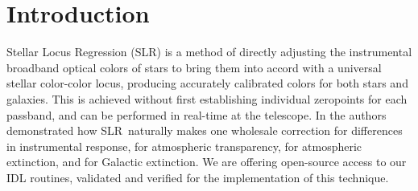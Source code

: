 \documentclass{report}
\newcommand{\slr}{SLR}
\begin{document}





\tableofcontents
{}
\setcounter{page}{1}

% 

\chapter{Introduction}

Stellar Locus Regression (\slr) is a method of directly adjusting the
instrumental broadband optical colors of stars to bring them into
accord with a universal stellar color-color locus, producing
accurately calibrated colors for both stars and galaxies.  This is
achieved without first establishing individual zeropoints for each
passband, and can be performed in real-time at the telescope.  In
\citet{bib:slr} the authors demonstrated how \slr\ naturally makes one
wholesale correction for differences in instrumental response, for
atmospheric transparency, for atmospheric extinction, and for Galactic
extinction.  We are offering open-source access to our IDL routines,
validated and verified for the implementation of this technique.
\end{document}
